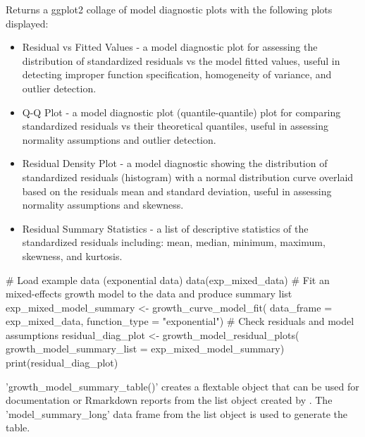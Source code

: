 \documentclass[a4paper]{book}
\begin{document}
%
\begin{Value}
Returns a ggplot2 collage of model diagnostic plots with the
following plots displayed:
\begin{itemize}

\item{} Residual vs Fitted Values - a model diagnostic plot for assessing
the distribution of standardized residuals vs the model fitted values,
useful in detecting improper function specification, homogeneity of
variance, and outlier detection.
\item{} Q-Q Plot - a model diagnostic plot (quantile-quantile) plot for
comparing standardized residuals vs their theoretical quantiles,
useful in assessing normality assumptions and outlier detection.
\item{} Residual Density Plot - a model diagnostic showing the distribution
of standardized residuals (histogram) with a normal distribution curve
overlaid based on the residuals mean and standard deviation, useful in
assessing normality assumptions and skewness.
\item{} Residual Summary Statistics - a list of descriptive statistics of
the standardized residuals including: mean, median, minimum, maximum,
skewness, and kurtosis.

\end{itemize}

\end{Value}
%
\begin{SeeAlso}
\end{SeeAlso}
%
\begin{Examples}
\begin{ExampleCode}
# Load example data (exponential data)
data(exp_mixed_data)
# Fit an mixed-effects growth model to the data and produce summary list
exp_mixed_model_summary <- growth_curve_model_fit(
data_frame = exp_mixed_data,
function_type = "exponential")
# Check residuals and model assumptions
residual_diag_plot <- growth_model_residual_plots(
  growth_model_summary_list = exp_mixed_model_summary)
print(residual_diag_plot)
\end{ExampleCode}
\end{Examples}
%
\begin{Description}
'growth\_model\_summary\_table()' creates a flextable object that can be used
for documentation or Rmarkdown reports from the list object created
by .
The 'model\_summary\_long' data frame from the list object is used to
generate the table.
\end{Description}
\end{document}
